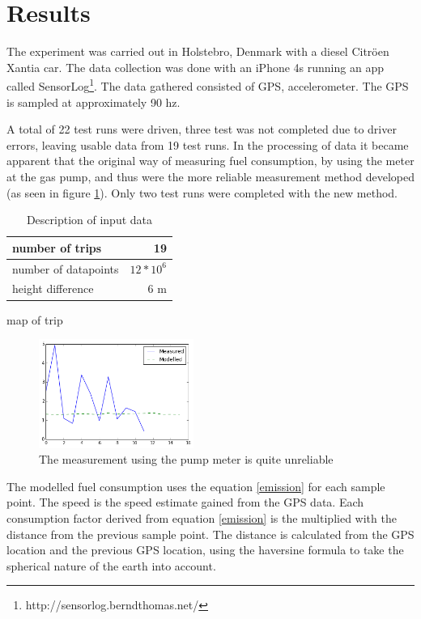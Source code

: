\section{Results}

The experiment was carried out in Holstebro, Denmark with a diesel Citr\"oen Xantia car. The data collection was done with an iPhone 4s running an app called SensorLog\footnote{http://sensorlog.berndthomas.net/}. The data gathered consisted of GPS, accelerometer. The GPS is sampled at approximately 90 hz.

A total of 22 test runs were driven, three test was not completed due to driver errors, leaving
usable data from 19 test runs. In the processing of data it became apparent that the original way of measuring fuel consumption, by using the meter at the gas pump, and thus were the more reliable measurement method developed (as seen in figure \ref{measured}). Only two test runs were completed with the new method.

\begin{table}
\begin{tabular}{| l | r |}
\hline 
number of trips & 19 \\[0.1cm] \hline
number of datapoints & $12*10^6$\\[0.1cm] \hline
height difference & 6 m\\[0.1cm]
\hline 

\end{tabular}
\label{datatable}
\caption{Description of input data}
\end{table}
map of trip

\begin{figure}[h]
	\centering
	\includegraphics[width=0.45\textwidth]{Measured_consumption}
  \caption{The measurement using the pump meter is quite unreliable}
  \label{measured}
\end{figure}

The modelled fuel consumption uses the equation \ref{emission} for each sample point. The speed is the speed estimate gained from the GPS data. Each consumption factor derived from  equation \ref{emission} is the multiplied with the distance from the previous sample point. The distance is calculated from the GPS location and the previous GPS location, using the haversine formula \cite{rick1999deriving} to take the spherical nature of the earth into account.

